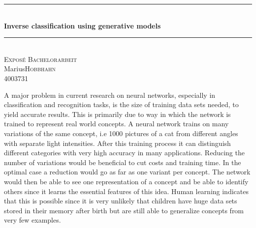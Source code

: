 \documentclass[a4paper, 12pt, english , titlepage]{article}
\newcommand{\name}{Hobbhahn}
\newcommand{\vorname}{Marius}
\newcommand{\matrikelnr}{4003731}
\newcommand{\titel}{Inverse classification using generative models}
\begin{document}
	
	\begin{center}
		
		
		
		
		\newcommand{\HRule}{\rule{\linewidth}{0.5mm}}
		\HRule \\[0.4cm]
		\vspace{0.4cm}
		{\large \bfseries \titel}\\[0.4cm]
		
		\HRule \\[0.5cm]
		
		\textsc{\large Exposé Bachelorarbeit}\\[0.3cm]
		
		\vorname \space \textsc {\name}  \\ 
		
		\matrikelnr\\
		[1.5cm]
		
	\end{center}
	
	A major problem in current research on neural networks, especially in classification and recognition tasks, is the size of training data sets needed, to yield accurate results. This is primarily due to way in which the network is trained to represent real world concepts. A neural network trains on many variations of the same concept, i.e 1000 pictures of a cat from different angles with separate light intensities. After this training process it can distinguish different categories with very high accuracy in many applications. Reducing the number of variations would be beneficial to cut costs and training time. In the optimal case a reduction would go as far as one variant per concept. The network would then be able to see one representation of a concept and be able to identify others since it learns the essential features of this idea. Human learning indicates that this is possible since it is very unlikely that children have huge data sets stored in their memory after birth but are still able to generalize concepts from very few examples. 
	
\end{document}

